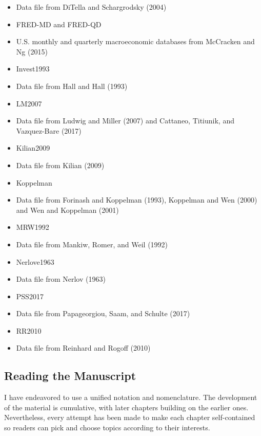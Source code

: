 \documentclass[10pt]{article}
\begin{document}
\begin{itemize}
  \item Data file from DiTella and Schargrodsky (2004)

  \item FRED-MD and FRED-QD

  \item U.S. monthly and quarterly macroeconomic databases from McCracken and Ng (2015)

  \item Invest1993

  \item Data file from Hall and Hall (1993)

  \item LM2007

  \item Data file from Ludwig and Miller (2007) and Cattaneo, Titiunik, and Vazquez-Bare (2017)

  \item Kilian2009

  \item Data file from Kilian (2009)

  \item Koppelman

  \item Data file from Forinash and Koppelman (1993), Koppelman and Wen (2000) and Wen and Koppelman (2001)

  \item MRW1992

  \item Data file from Mankiw, Romer, and Weil (1992)

  \item Nerlove1963

  \item Data file from Nerlov (1963)

  \item PSS2017

  \item Data file from Papageorgiou, Saam, and Schulte (2017)

  \item RR2010

  \item Data file from Reinhard and Rogoff (2010)

\end{itemize}
\subsection{Reading the Manuscript}
I have endeavored to use a unified notation and nomenclature. The development of the material is cumulative, with later chapters building on the earlier ones. Nevertheless, every attempt has been made to make each chapter self-contained so readers can pick and choose topics according to their interests.
\end{document}
